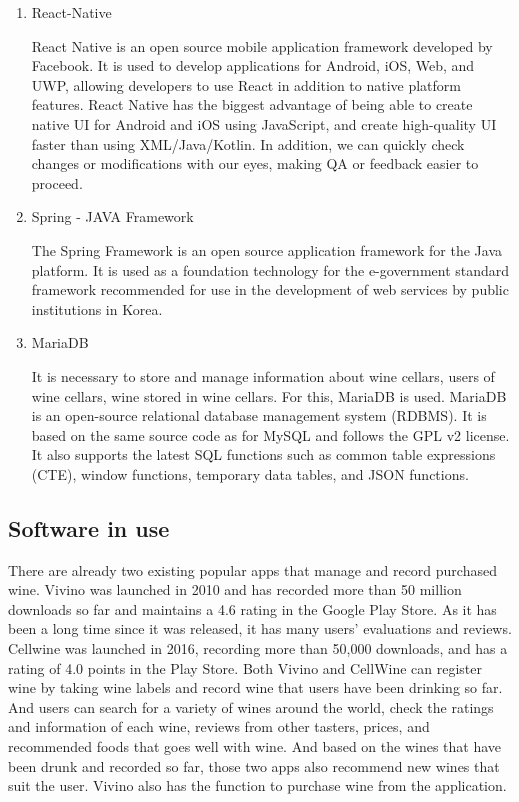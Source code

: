 \documentclass[conference]{IEEEtran}
\numberwithin{figure}{subsection}
\begin{document}
\begin{enumerate}
    \item React-Native
    
    
    React Native is an open source mobile application framework developed by Facebook. It is used to develop applications for Android, iOS, Web, and UWP, allowing developers to use React in addition to native platform features. React Native has the biggest advantage of being able to create native UI for Android and iOS using JavaScript, and create high-quality UI faster than using XML/Java/Kotlin. In addition, we can quickly check changes or modifications with our eyes, making QA or feedback easier to proceed. 
    \item Spring - JAVA Framework
    
    
    The Spring Framework is an open source application framework for the Java platform. It is used as a foundation technology for the e-government standard framework recommended for use in the development of web services by public institutions in Korea.
    \item MariaDB
    
    
    It is necessary to store and manage information about wine cellars, users of wine cellars, wine stored in wine cellars. For this, MariaDB is used. MariaDB is an open-source relational database management system (RDBMS). It is based on the same source code as for MySQL and follows the GPL v2 license. It also supports the latest SQL functions such as common table expressions (CTE), window functions, temporary data tables, and JSON functions.
\end{enumerate}
\subsection{Software in use}
There are already two existing popular apps that manage and record purchased wine. Vivino was launched in 2010 and has recorded more than 50 million downloads so far and maintains a 4.6 rating in the Google Play Store. As it has been a long time since it was released, it has many users' evaluations and reviews. Cellwine was launched in 2016, recording more than 50,000 downloads, and has a rating of 4.0 points in the Play Store. Both Vivino and CellWine can register wine by taking wine labels and record wine that users have been drinking so far. And users can search for a variety of wines around the world, check the ratings and information of each wine, reviews from other tasters, prices, and recommended foods that goes well with wine. And based on the wines that have been drunk and recorded so far, those two apps also recommend new wines that suit the user. Vivino also has the function to purchase wine from the application.
\end{document}
